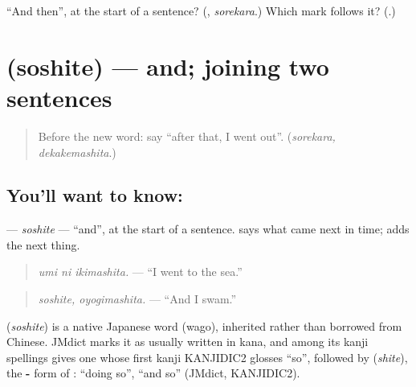 \begin{tcolorbox}[breakable,colback=teal!4,colframe=teal!35!black,title={Before you move on}]
\textquotedblleft{}And then\textquotedblright{}, at the start of a sentence? (\textbf{}, \emph{sorekara}.) Which mark follows it? (\textbf{}.)
\end{tcolorbox}
\section[\texorpdfstring{\ja{そして} (soshite)}{そして (soshite)}]{ (soshite) — and; joining two sentences}

\label{lesson:JA-C252-soshite}



\begin{quote}
Before the new word: say \textquotedblleft{}after that, I went out\textquotedblright{}. (\emph{sorekara, dekakemashita}.)
\end{quote}

\subsection*{You'll want to know: }
\textbf{} — \emph{soshite} — \textquotedblleft{}and\textquotedblright{}, at the start of a sentence. \textbf{} says what came next in time; \textbf{} adds the next thing.

\begin{quote}
\textbf{ }
\end{quote}

\begin{quote}
\emph{umi ni ikimashita.} — \textquotedblleft{}I went to the sea.\textquotedblright{}
\end{quote}

\begin{quote}
\textbf{}
\end{quote}

\begin{quote}
\emph{soshite, oyogimashita.} — \textquotedblleft{}And I swam.\textquotedblright{}
\end{quote}

\begin{cousinweb}
\textbf{} (\emph{soshite}) is a native Japanese word (wago), inherited rather than borrowed from Chinese. JMdict marks it as usually written in kana, and among its kanji spellings gives one whose first kanji KANJIDIC2 glosses \textquotedblleft{}so\textquotedblright{}, followed by \textbf{} (\emph{shite}), the \textbf{-} form of \textbf{}: \textquotedblleft{}doing so\textquotedblright{}, \textquotedblleft{}and so\textquotedblright{} (JMdict, KANJIDIC2).
\end{cousinweb}

